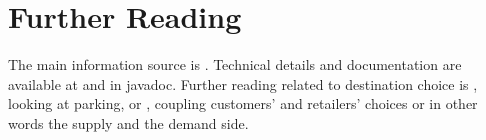 \section{Further Reading}
The main information source is \citet[][]{HorniEtAl_unpub_TRB_2012, Horni_PhDThesis_2013}. 
Technical details and documentation are available at \citet[][]{MATSIM-T-DC_Webpage_2015} and in \gls{javadoc}. 
Further reading related to destination choice is \citet[][]{HorniEtAl_IATBRspec_2013}, looking at parking, or \citet[][]{HorniEtAl_TechRep_IVT_2012}, coupling customers' and retailers' choices or in other words the supply and the demand side.




